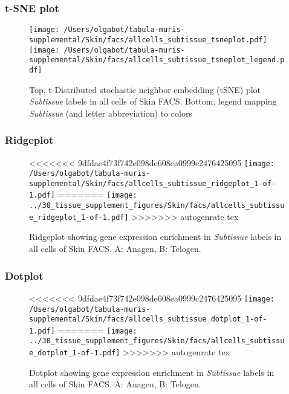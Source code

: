 \clearpage
\subsubsection{t-SNE plot}
\begin{figure}[h]
\centering
\texttt{[image: /Users/olgabot/tabula-muris-supplemental/Skin/facs/allcells\_subtissue\_tsneplot.pdf]}
\texttt{[image: /Users/olgabot/tabula-muris-supplemental/Skin/facs/allcells\_subtissue\_tsneplot\_legend.pdf]}
\caption{Top, t-Distributed stochastic neighbor embedding (tSNE) plot  \emph{Subtissue} labels in all cells of Skin FACS. Bottom, legend mapping \emph{Subtissue} (and letter abbreviation) to colors}
\end{figure}


\clearpage

\subsubsection{Ridgeplot}
\begin{figure}[h]
\centering
<<<<<<< 9dfdae4f73f742e098de608ea0999c2476425095
\texttt{[image: /Users/olgabot/tabula-muris-supplemental/Skin/facs/allcells\_subtissue\_ridgeplot\_1-of-1.pdf]}
=======
\texttt{[image: ../30\_tissue\_supplement\_figures/Skin/facs/allcells\_subtissue\_ridgeplot\_1-of-1.pdf]}
>>>>>>> autogenrate tex

\caption{ Ridgeplot  showing gene expression enrichment in \emph{Subtissue} labels in all cells of Skin FACS. A: Anagen, B: Telogen.}
\end{figure}


\clearpage

\subsubsection{Dotplot}
\begin{figure}[h]
\centering
<<<<<<< 9dfdae4f73f742e098de608ea0999c2476425095
\texttt{[image: /Users/olgabot/tabula-muris-supplemental/Skin/facs/allcells\_subtissue\_dotplot\_1-of-1.pdf]}
=======
\texttt{[image: ../30\_tissue\_supplement\_figures/Skin/facs/allcells\_subtissue\_dotplot\_1-of-1.pdf]}
>>>>>>> autogenrate tex

\caption{ Dotplot  showing gene expression enrichment in \emph{Subtissue} labels in all cells of Skin FACS. A: Anagen, B: Telogen.}
\end{figure}

